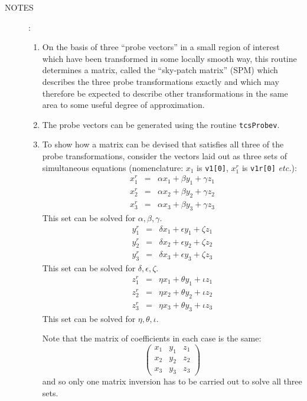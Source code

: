 \documentclass[12pt,fleqn,twoside]{article}
\renewcommand{\_}{{\tt\char'137}}     %
\newcommand{\notes}[1]
{
  \goodbreak
  \begin{description}
    \item[NOTES]: \nopagebreak
        #1
  \end{description}
  \vspace{-3ex}
}
\begin{document}
\notes{
\begin{enumerate}
\setlength{\parskip}{\medskipamount}
\item On the basis of three ``probe vectors'' in a small region of interest
      which have been transformed in some locally smooth way, this routine
      determines a matrix, called the ``sky-patch matrix'' (SPM)
      which describes the three probe transformations
      exactly and which may therefore be expected to describe other
      transformations in the same area to some useful degree of
      approximation.
\item The probe vectors can be generated using the routine {\tt tcsProbev}.
\item To show how a matrix can be devised that satisfies
      all three of
      the probe transformations, consider the vectors laid out as three
      sets of simultaneous equations (nomenclature:  $x_1$ is {\tt v1[0]},
                      $x_1^r$ is {\tt v1r[0]} {\it etc.}):
      \begin{eqnarray*}
      x_1^r & = & \alpha x_1 + \beta y_1 + \gamma z_1 \\
      x_2^r & = & \alpha x_2 + \beta y_2 + \gamma z_2 \\
      x_3^r & = & \alpha x_3 + \beta y_3 + \gamma z_3
      \end{eqnarray*}
      This set can be solved for $\alpha,\beta,\gamma$.
      \begin{eqnarray*}
      y_1^r & = & \delta x_1 + \epsilon y_1 + \zeta z_1 \\
      y_2^r & = & \delta x_2 + \epsilon y_2 + \zeta z_2 \\
      y_3^r & = & \delta x_3 + \epsilon y_3 + \zeta z_3
      \end{eqnarray*}
      This set can be solved for $\delta,\epsilon,\zeta$.
      \begin{eqnarray*}
      z_1^r & = & \eta x_1 + \theta y_1 + \iota z_1 \\
      z_2^r & = & \eta x_2 + \theta y_2 + \iota z_2 \\
      z_3^r & = & \eta x_3 + \theta y_3 + \iota z_3
      \end{eqnarray*}
      This set can be solved for $\eta,\theta,\iota$.

      Note that the matrix of coefficients in each case is the same:
      \[ \left( \begin{array}{ccc}
                x_1 & y_1 & z_1 \\
                x_2 & y_2 & z_2 \\
                x_3 & y_3 & z_3
                \end{array} \right) \]
      and so only one matrix inversion has to be carried out to solve
      all three sets.


\end{enumerate}}
\end{document}
